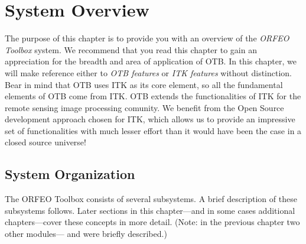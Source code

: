 \chapter{System Overview}
\label{chapter:SystemOverview}

The purpose of this chapter is to provide you with an overview of the
\emph{ORFEO Toolbox} system. We recommend that you read this chapter to
gain an appreciation for the breadth and area of application of
OTB. In this chapter, we will make reference either to \emph{OTB
  features} or \emph{ITK features} without distinction. Bear in mind
that OTB uses ITK as its core element, so all the fundamental elements
of OTB come from ITK. OTB extends the functionalities of ITK for the
remote sensing image processing comunity. We benefit from the Open
Source development approach chosen for ITK, which allows us to provide
an impressive set of functionalities with much lesser effort than it
would have been the case in a closed source universe!

\section{System Organization}
\label{sec:SystemOrganization}

The ORFEO Toolbox consists of several subsystems. A brief
description of these subsystems follows. Later sections in this chapter---and
in some cases additional chapters---cover these concepts in more detail. (Note:
in the previous chapter two other modules--- and
 were briefly described.)

